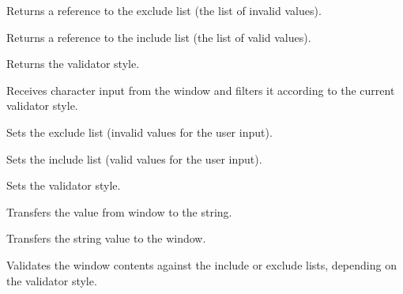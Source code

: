 
Returns a reference to the exclude list (the list of invalid values).

\label{wxtextvalidatorgetincludelist}


Returns a reference to the include list (the list of valid values).

\label{wxtextvalidatorgetstyle}


Returns the validator style.

\label{wxtextvalidatoronchar}


Receives character input from the window and filters it according to the
current validator style.

\label{wxtextvalidatorsetexcludelist}


Sets the exclude list (invalid values for the user input).

\label{wxtextvalidatorsetincludelist}


Sets the include list (valid values for the user input).

\label{wxtextvalidatorsetstyle}


Sets the validator style.

\label{wxtextvalidatortransferfromwindow}


Transfers the value from window to the string.

\label{wxtextvalidatortransfertowindow}


Transfers the string value to the window.

\label{wxtextvalidatorvalidate}


Validates the window contents against the include or exclude lists, depending
on the validator style.

